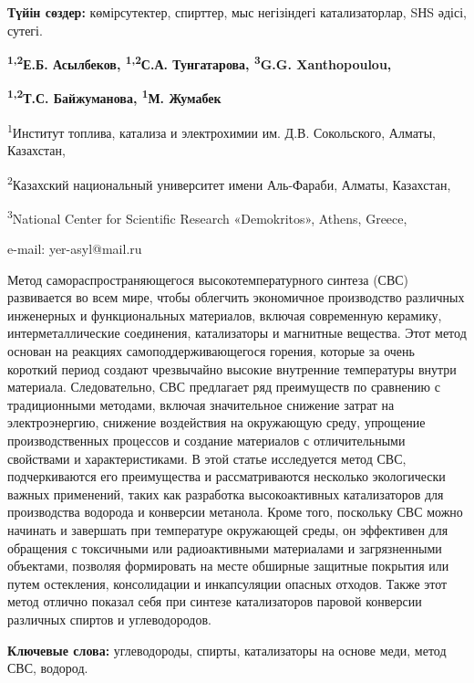 {\bfseries Түйін сөздер:} көмірсутектер, спирттер, мыс негізіндегі
катализаторлар, SНS әдісі, сутегі.


\begin{center}
{\bfseries \textsuperscript{1,2}Е.Б. Асылбеков, \textsuperscript{1,2}С.А.
Тунгатарова, \textsuperscript{3}G.G. Xanthopoulou,}

{\bfseries \textsuperscript{1,2}Т.С. Байжуманова, \textsuperscript{1}М.
Жумабек}

\textsuperscript{1}Институт топлива, катализа и электрохимии им. Д.В.
Сокольского, Алматы, Казахстан,

\textsuperscript{2}Казахский национальный университет имени Аль-Фараби,
Алматы, Казахстан,

\textsuperscript{3}National Center for Scientific Research «Demokritos»,
Athens, Greece,

e-mail: yer-asyl@mail.ru
\end{center}

Метод самораспространяющегося высокотемпературного синтеза (СВС)
развивается во всем мире, чтобы облегчить экономичное производство
различных инженерных и функциональных материалов, включая современную
керамику, интерметаллические соединения, катализаторы и магнитные
вещества. Этот метод основан на реакциях самоподдерживающегося горения,
которые за очень короткий период создают чрезвычайно высокие внутренние
температуры внутри материала. Следовательно, СВС предлагает ряд
преимуществ по сравнению с традиционными методами, включая значительное
снижение затрат на электроэнергию, снижение воздействия на окружающую
среду, упрощение производственных процессов и создание материалов с
отличительными свойствами и характеристиками. В этой статье исследуется
метод СВС, подчеркиваются его преимущества и рассматриваются несколько
экологически важных применений, таких как разработка высокоактивных
катализаторов для производства водорода и конверсии метанола. Кроме
того, поскольку СВС можно начинать и завершать при температуре
окружающей среды, он эффективен для обращения с токсичными или
радиоактивными материалами и загрязненными объектами, позволяя
формировать на месте обширные защитные покрытия или путем остекления,
консолидации и инкапсуляции опасных отходов. Также этот метод отлично
показал себя при синтезе катализаторов паровой конверсии различных
спиртов и углеводородов.

{\bfseries Ключевые слова:} углеводороды, спирты, катализаторы на основе
меди, метод СВС, водород.

